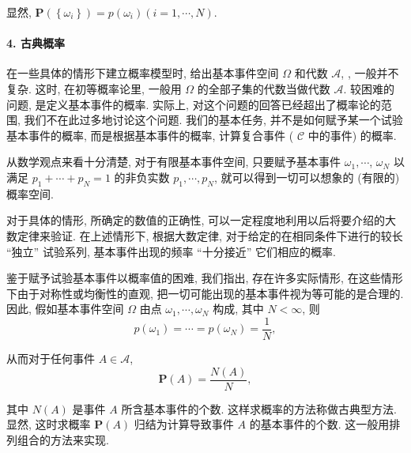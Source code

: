 显然, $\mathbf{P}\left(\left\{\omega_i\right\}\right)=p\left(\omega_i\right)(i=1, \cdots, N)$. 

\paragraph{4. 古典概率}在一些具体的情形下建立概率模型时, 给出基本事件空间 $\Omega$ 和代数 $\mathscr{A}$, , 一般并不复杂. 这时, 在初等概率论里, 一般用 $\Omega$ 的全部子集的代数当做代数 $\mathscr{A}$. 较困难的问题, 是定义基本事件的概率. 实际上, 对这个问题的回答已经超出了概率论的范围, 我们不在此过多地讨论这个问题. 我们的基本任务, 并不是如何赋予某一个试验基本事件的概率, 而是根据基本事件的概率, 计算复合事件 ( $\mathscr{C}$ 中的事件) 的概率.

从数学观点来看十分清楚, 对于有限基本事件空间, 只要赋予基本事件 $\omega_1, \cdots$, $\omega_N$ 以满足 $p_1+\cdots+p_N=1$ 的非负实数 $p_1, \cdots, p_N$, 就可以得到一切可以想象的 (有限的) 概率空间.

对于具体的情形, 所确定的数值的正确性, 可以一定程度地利用以后将要介绍的大数定律来验证. 在上述情形下, 根据大数定律, 对于给定的在相同条件下进行的较长 ``独立'' 试验系列, 基本事件出现的频率 ``十分接近'' 它们相应的概率.

鉴于赋予试验基本事件以概率值的困难, 我们指出, 存在许多实际情形, 在这些情形下由于对称性或均衡性的直观, 把一切可能出现的基本事件视为等可能的是合理的. 因此, 假如基本事件空间 $\Omega$ 由点 $\omega_1, \cdots, \omega_N$ 构成, 其中 $N<\infty$, 则
$$
p\left(\omega_1\right)=\cdots=p\left(\omega_N\right)=\frac{1}{N},
$$

从而对于任何事件 $A \in \mathscr{A}$,
$$
\mathbf{P}(A)=\frac{N(A)}{N},
$$

其中 $N(A)$ 是事件 $A$ 所含基本事件的个数.
这样求概率的方法称做古典型方法. 显然, 这时求概率 $\mathbf{P}(A)$ 归结为计算导致事件 $A$ 的基本事件的个数. 这一般用排列组合的方法来实现. 